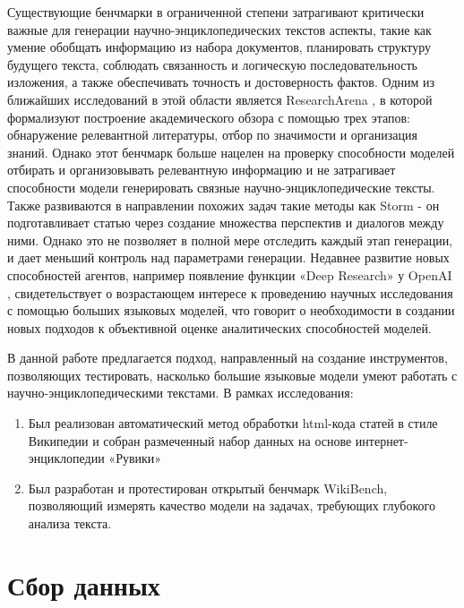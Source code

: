 \documentclass{article}
\theoremstyle{definition}
\theoremstyle{plain}
\begin{document}
Существующие бенчмарки в ограниченной степени затрагивают критически важные для генерации научно-энциклопедических текстов аспекты, 
такие как умение обобщать информацию из набора документов, планировать структуру будущего текста, соблюдать связанность и логическую последовательность изложения, а также обеспечивать точность и достоверность фактов. 
Одним из ближайших исследований в этой области является ResearchArena \cite{resar}, в которой формализуют построение академического обзора с помощью трех этапов:
обнаружение релевантной литературы, отбор по значимости и организация знаний. Однако этот бенчмарк больше нацелен на проверку способности моделей отбирать и организовывать релевантную информацию
и не затрагивает способности модели генерировать связные научно-энциклопедические тексты.
Также развиваются в направлении похожих задач такие методы как Storm \cite{storm} - он подготавливает статью через создание множества перспектив и диалогов между ними.
Однако это не позволяет в полной мере отследить каждый этап генерации, и дает меньший контроль над параметрами генерации.
Недавнее развитие новых способностей агентов, например появление функции «Deep Research» у OpenAI \cite{deepr}, 
свидетельствует о возрастающем интересе к проведению научных исследования с помощью больших языковых моделей, 
что говорит о необходимости в создании новых подходов к объективной оценке аналитических способностей моделей. 

В данной работе предлагается подход, направленный на создание 
инструментов, позволяющих тестировать, насколько большие языковые модели умеют работать с научно-энциклопедическими текстами.
В рамках исследования:
\begin{enumerate}

    \item Был реализован автоматический метод обработки html-кода статей в стиле Википедии и собран размеченный набор данных на основе интернет-энциклопедии «Рувики»
    
    \item Был разработан и протестирован открытый бенчмарк WikiBench, позволяющий измерять качество модели на задачах, требующих глубокого анализа текста.

\end{enumerate}

\section*{Сбор данных}
\end{document}
